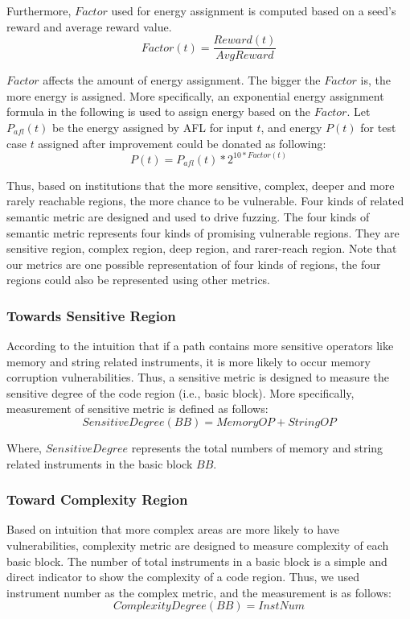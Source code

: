 Furthermore, $Factor$ used for energy assignment is computed based on a seed's reward and average reward value. 
 \begin{equation}
Factor(t)= \dfrac{Reward(t)}{AvgReward}
 \end{equation}

$Factor$ affects the amount of energy assignment. The bigger the $Factor$ is, the more energy is assigned.  More specifically, an exponential energy assignment formula in the following is used to assign energy based on the $Factor$. Let $P_{afl}(t)$ be the energy assigned by AFL for input $t$, and energy $P(t)$ for test case $t$ assigned after improvement could be donated as following:
\begin{equation}
P(t) = P_{afl}(t) * 2^{ 10 * Factor(t)}
\end{equation}

Thus, based on institutions that the more sensitive, complex, deeper and more rarely reachable regions, the more chance to be vulnerable. Four kinds of related semantic metric are designed and used to drive fuzzing. The four kinds of semantic metric represents four kinds of promising vulnerable regions. They are sensitive region,  complex region, deep region, and rarer-reach region. Note that our metrics are one possible representation of four kinds of regions, the four regions could also be represented using other metrics.

\subsubsection{Towards Sensitive Region}
According to the intuition that if a path contains more sensitive operators like memory and string related instruments, it is more likely to occur memory corruption vulnerabilities.  Thus, a sensitive metric is designed to measure the sensitive degree of the code region (i.e., basic block). More specifically, measurement of sensitive metric is defined as follows:
\begin{equation}
SensitiveDegree(BB) =MemoryOP + StringOP
\end{equation}

Where, $SensitiveDegree$ represents the total numbers of memory and string related instruments in the basic block $BB$. 

\subsubsection{Toward Complexity Region}
Based on intuition that more complex areas are more likely to have vulnerabilities, complexity metric are designed to measure complexity of each basic block. The number of total instruments in a basic block is a simple and direct indicator to show the complexity of a code region. Thus, we used instrument number as the complex metric, and the measurement is as follows:
\begin{equation}
ComplexityDegree(BB) ={InstNum}
\end{equation}

